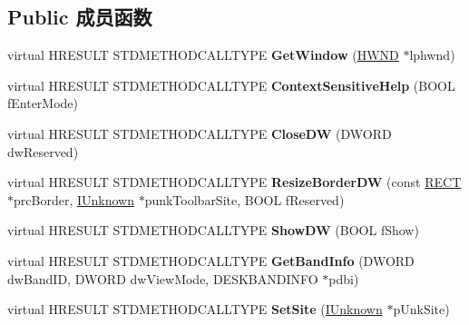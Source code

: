\subsection*{Public 成员函数}
\begin{DoxyCompactItemize}
\item 
\mbox{\label{class_c_explorer_band_acb36c17e6820bdf9119315770537cdfe}} 
virtual H\+R\+E\+S\+U\+LT S\+T\+D\+M\+E\+T\+H\+O\+D\+C\+A\+L\+L\+T\+Y\+PE {\bfseries Get\+Window} (\hyperlink{interfacevoid}{H\+W\+ND} $\ast$lphwnd)
\item 
\mbox{\label{class_c_explorer_band_ae93168343b4a9641839db85201356298}} 
virtual H\+R\+E\+S\+U\+LT S\+T\+D\+M\+E\+T\+H\+O\+D\+C\+A\+L\+L\+T\+Y\+PE {\bfseries Context\+Sensitive\+Help} (B\+O\+OL f\+Enter\+Mode)
\item 
\mbox{\label{class_c_explorer_band_ae4554d0d8b3fc95cb042b2ce25cb90e9}} 
virtual H\+R\+E\+S\+U\+LT S\+T\+D\+M\+E\+T\+H\+O\+D\+C\+A\+L\+L\+T\+Y\+PE {\bfseries Close\+DW} (D\+W\+O\+RD dw\+Reserved)
\item 
\mbox{\label{class_c_explorer_band_af37a736f5a8c88892a2bce66eb19b687}} 
virtual H\+R\+E\+S\+U\+LT S\+T\+D\+M\+E\+T\+H\+O\+D\+C\+A\+L\+L\+T\+Y\+PE {\bfseries Resize\+Border\+DW} (const \hyperlink{structtag_r_e_c_t}{R\+E\+CT} $\ast$prc\+Border, \hyperlink{interface_i_unknown}{I\+Unknown} $\ast$punk\+Toolbar\+Site, B\+O\+OL f\+Reserved)
\item 
\mbox{\label{class_c_explorer_band_aa43016a1d78fdd7ed66d33a0506ab075}} 
virtual H\+R\+E\+S\+U\+LT S\+T\+D\+M\+E\+T\+H\+O\+D\+C\+A\+L\+L\+T\+Y\+PE {\bfseries Show\+DW} (B\+O\+OL f\+Show)
\item 
\mbox{\label{class_c_explorer_band_aa0fb7f9562ed996500f567ccc6ad31a2}} 
virtual H\+R\+E\+S\+U\+LT S\+T\+D\+M\+E\+T\+H\+O\+D\+C\+A\+L\+L\+T\+Y\+PE {\bfseries Get\+Band\+Info} (D\+W\+O\+RD dw\+Band\+ID, D\+W\+O\+RD dw\+View\+Mode, D\+E\+S\+K\+B\+A\+N\+D\+I\+N\+FO $\ast$pdbi)
\item 
\mbox{\label{class_c_explorer_band_abb2bee24afc8202f84c31829d5b78e64}} 
virtual H\+R\+E\+S\+U\+LT S\+T\+D\+M\+E\+T\+H\+O\+D\+C\+A\+L\+L\+T\+Y\+PE {\bfseries Set\+Site} (\hyperlink{interface_i_unknown}{I\+Unknown} $\ast$p\+Unk\+Site)

\end{DoxyCompactItemize}

